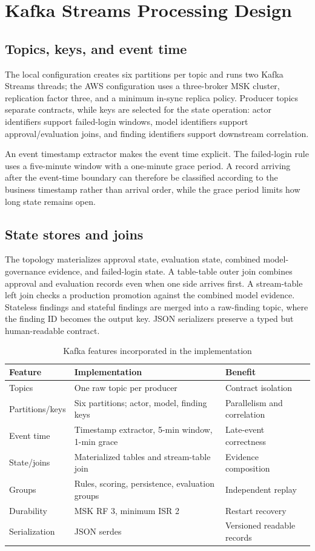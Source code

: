 \documentclass[conference]{IEEEtran}
\begin{document}
\section{Kafka Streams Processing Design}
\subsection{Topics, keys, and event time}
The local configuration creates six partitions per topic and runs two Kafka Streams threads; the AWS configuration uses a three-broker MSK cluster, replication factor three, and a minimum in-sync replica policy. Producer topics separate contracts, while keys are selected for the state operation: actor identifiers support failed-login windows, model identifiers support approval/evaluation joins, and finding identifiers support downstream correlation.

An event timestamp extractor makes the event time explicit. The failed-login rule uses a five-minute window with a one-minute grace period. A record arriving after the event-time boundary can therefore be classified according to the business timestamp rather than arrival order, while the grace period limits how long state remains open.

\subsection{State stores and joins}
The topology materializes approval state, evaluation state, combined model-governance evidence, and failed-login state. A table-table outer join combines approval and evaluation records even when one side arrives first. A stream-table left join checks a production promotion against the combined model evidence. Stateless findings and stateful findings are merged into a raw-finding topic, where the finding ID becomes the output key. JSON serializers preserve a typed but human-readable contract.

\begin{table}[t]
\caption{Kafka features incorporated in the implementation}
\label{tab:kafka}
\centering\tiny
\begin{tabular}{p{1.7cm}p{2.5cm}p{2.2cm}}
\toprule
\textbf{Feature} & \textbf{Implementation} & \textbf{Benefit}\\
\midrule
Topics & One raw topic per producer & Contract isolation\\
Partitions/keys & Six partitions; actor, model, finding keys & Parallelism and correlation\\
Event time & Timestamp extractor, 5-min window, 1-min grace & Late-event correctness\\
State/joins & Materialized tables and stream-table join & Evidence composition\\
Groups & Rules, scoring, persistence, evaluation groups & Independent replay\\
Durability & MSK RF 3, minimum ISR 2 & Restart recovery\\
Serialization & JSON serdes & Versioned readable records\\
\bottomrule
\end{tabular}
\end{table}
\end{document}
